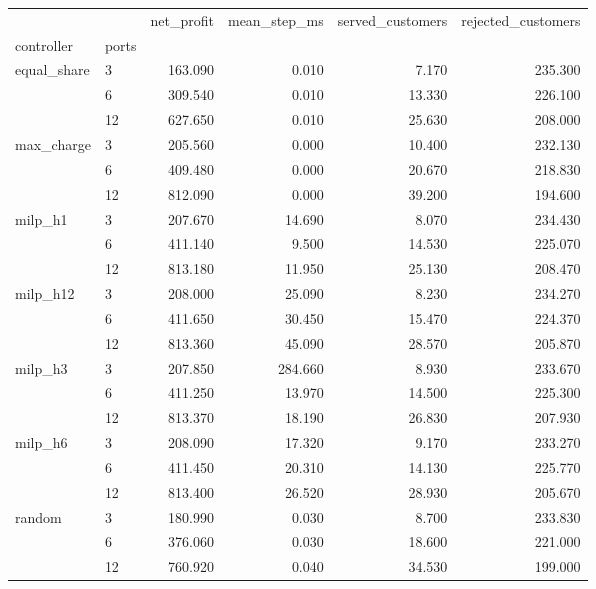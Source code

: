 \begin{tabular}{llrrrr}
\toprule
 &  & net_profit & mean_step_ms & served_customers & rejected_customers \\
controller & ports &  &  &  &  \\
\midrule
\multirow[t]{3}{*}{equal_share} & 3 & 163.090 & 0.010 & 7.170 & 235.300 \\
 & 6 & 309.540 & 0.010 & 13.330 & 226.100 \\
 & 12 & 627.650 & 0.010 & 25.630 & 208.000 \\
\cline{1-6}
\multirow[t]{3}{*}{max_charge} & 3 & 205.560 & 0.000 & 10.400 & 232.130 \\
 & 6 & 409.480 & 0.000 & 20.670 & 218.830 \\
 & 12 & 812.090 & 0.000 & 39.200 & 194.600 \\
\cline{1-6}
\multirow[t]{3}{*}{milp_h1} & 3 & 207.670 & 14.690 & 8.070 & 234.430 \\
 & 6 & 411.140 & 9.500 & 14.530 & 225.070 \\
 & 12 & 813.180 & 11.950 & 25.130 & 208.470 \\
\cline{1-6}
\multirow[t]{3}{*}{milp_h12} & 3 & 208.000 & 25.090 & 8.230 & 234.270 \\
 & 6 & 411.650 & 30.450 & 15.470 & 224.370 \\
 & 12 & 813.360 & 45.090 & 28.570 & 205.870 \\
\cline{1-6}
\multirow[t]{3}{*}{milp_h3} & 3 & 207.850 & 284.660 & 8.930 & 233.670 \\
 & 6 & 411.250 & 13.970 & 14.500 & 225.300 \\
 & 12 & 813.370 & 18.190 & 26.830 & 207.930 \\
\cline{1-6}
\multirow[t]{3}{*}{milp_h6} & 3 & 208.090 & 17.320 & 9.170 & 233.270 \\
 & 6 & 411.450 & 20.310 & 14.130 & 225.770 \\
 & 12 & 813.400 & 26.520 & 28.930 & 205.670 \\
\cline{1-6}
\multirow[t]{3}{*}{random} & 3 & 180.990 & 0.030 & 8.700 & 233.830 \\
 & 6 & 376.060 & 0.030 & 18.600 & 221.000 \\
 & 12 & 760.920 & 0.040 & 34.530 & 199.000 \\
\cline{1-6}
\bottomrule
\end{tabular}
